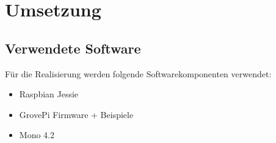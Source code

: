 \section{Umsetzung}

\subsection{Verwendete Software}
Für die Realisierung werden folgende Softwarekomponenten verwendet:

\begin{itemize}
\item Raspbian Jessie
\item GrovePi Firmware + Beispiele
\item Mono 4.2
\end{itemize}





